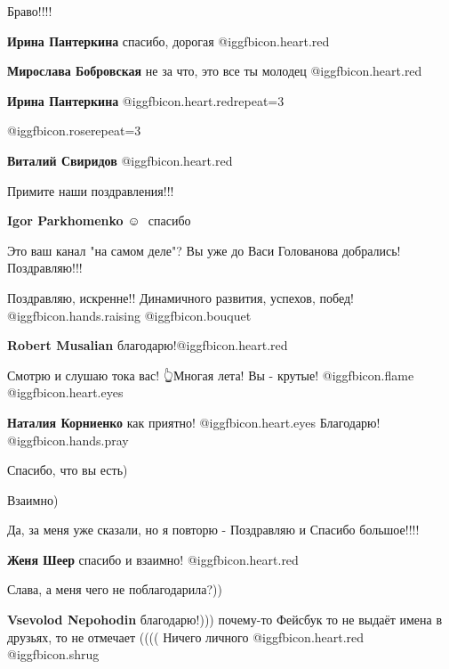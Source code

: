 \begin{itemize}
Браво!!!!

\textbf{Ирина Пантеркина} спасибо, дорогая @igg{fbicon.heart.red}

\textbf{Мирослава Бобровская} не за что, это все ты молодец @igg{fbicon.heart.red}

\textbf{Ирина Пантеркина}  @igg{fbicon.heart.red}{repeat=3}

 @igg{fbicon.rose}{repeat=3} 


\textbf{Виталий Свиридов} @igg{fbicon.heart.red}

Примите наши поздравления!!!


\textbf{Igor Parkhomenko}  ☺ ️  спасибо

Это ваш канал "на самом деле"? Вы уже до Васи Голованова добрались! Поздравляю!!!

Поздравляю, искренне!! Динамичного развития, успехов, побед!  @igg{fbicon.hands.raising}  @igg{fbicon.bouquet} 

\textbf{Robert Musalian} благодарю!@igg{fbicon.heart.red}

Смотрю и слушаю тока вас! 👆Многая лета! Вы - крутые!  @igg{fbicon.flame}  @igg{fbicon.heart.eyes} 


\textbf{Наталия Корниенко} как приятно! @igg{fbicon.heart.eyes} Благодарю! @igg{fbicon.hands.pray} 

Спасибо, что вы есть)

Взаимно)

Да, за меня уже сказали, но я повторю - Поздравляю и Спасибо большое!!!!

\textbf{Женя Шеер} спасибо и взаимно! @igg{fbicon.heart.red}

Слава, а меня чего не поблагодарила?))

\begin{itemize} %
\textbf{Vsevolod Nepohodin} благодарю!))) почему-то Фейсбук то не выдаёт имена в друзьях, то не отмечает ((((
Ничего личного @igg{fbicon.heart.red} @igg{fbicon.shrug} 
\end{itemize} %


\end{itemize} %
